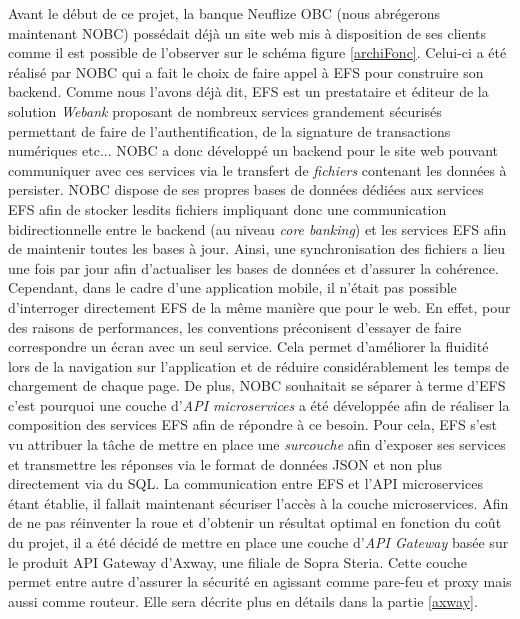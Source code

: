 	Avant le début de ce projet, la banque Neuflize OBC (nous abrégerons maintenant NOBC) possédait déjà un site web mis à disposition de ses clients comme il est possible de l'observer sur le schéma figure \ref{archiFonc}. Celui-ci a été réalisé par NOBC qui a fait le choix de faire appel à EFS pour construire son backend. Comme nous l'avons déjà dit, EFS est un prestataire et éditeur de la solution \textit{Webank} proposant de nombreux services grandement sécurisés permettant de faire de l'authentification, de la signature de transactions numériques etc... NOBC a donc développé un backend pour le site web pouvant communiquer avec ces services via le transfert de \textit{fichiers} contenant les données à persister. NOBC dispose de ses propres bases de données dédiées aux services EFS afin de stocker lesdits fichiers impliquant donc une communication bidirectionnelle entre le backend (au niveau \textit{core banking}) et  les services EFS afin de maintenir toutes les bases à jour. Ainsi, une synchronisation des fichiers a lieu une fois par jour afin d'actualiser les bases de données et d'assurer la cohérence. \\
	
	Cependant, dans le cadre d'une application mobile, il n'était pas possible d'interroger directement EFS de la même manière que pour le web. En effet, pour des raisons de performances, les conventions préconisent d'essayer de faire correspondre un écran avec un seul service. Cela permet d'améliorer la fluidité lors de la navigation sur l'application et de réduire considérablement les temps de chargement de chaque page. De plus, NOBC souhaitait se séparer à terme d'EFS c'est pourquoi une couche d'\textit{API microservices} a été développée afin de réaliser la composition des services EFS afin de répondre à ce besoin. Pour cela, EFS s'est vu attribuer la tâche de mettre en place une \textit{surcouche} afin d'exposer ses services et transmettre les réponses via le format de données JSON et non plus directement via du SQL. La communication entre EFS et l'API microservices étant établie, il fallait maintenant sécuriser l'accès à la couche microservices. Afin de ne pas réinventer la roue et d'obtenir un résultat optimal en fonction du coût du projet, il a été décidé de mettre en place une couche d'\textit{API Gateway} basée sur le produit API Gateway d'Axway, une filiale de Sopra Steria. Cette couche permet entre autre d'assurer la sécurité en agissant comme pare-feu et proxy mais aussi comme routeur. Elle sera décrite plus en détails dans la partie \ref{axway}.\\
	
